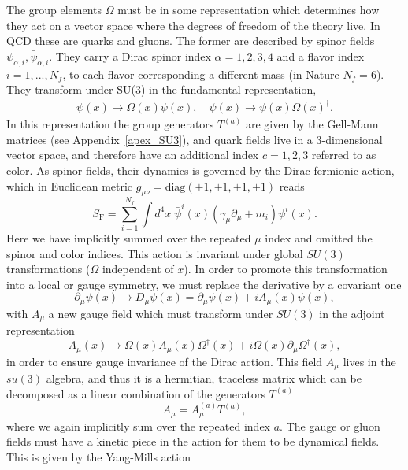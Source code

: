 The group elements $\Omega$ must be in some representation which determines how they act on a vector space where the degrees of freedom of the theory live. In QCD these are quarks and gluons. The former are described by spinor fields $\psi_{\alpha,i},\bar{\psi}_{\alpha,i}$. They carry a Dirac spinor index $\alpha=1,2,3,4$ and a flavor index $i=1,...,N_f$, to each flavor corresponding a different mass (in Nature $N_f=6$). They transform under SU(3) in the fundamental representation,
\begin{gather}
\psi(x)\to\Omega(x)\psi(x), \quad \bar{\psi}(x)\to\bar{\psi}(x)\Omega(x)^{\dagger}.
\end{gather}
In this representation the group generators $T^{(a)}$ are given by the Gell-Mann matrices (see Appendix~\ref{apex_SU3}), and quark fields live in a 3-dimensional vector space, and therefore have an additional index $c=1,2,3$ referred to as color. As spinor fields, their dynamics is governed by the Dirac fermionic action, which in Euclidean metric $g_{\mu\nu}=\textrm{diag}(+1,+1,+1,+1)$ reads
\begin{equation}
S_{\textrm{F}}=\sum_{i=1}^{N_f}\int d^4x\;\bar{\psi}^{i}(x)\left(\gamma_{\mu}\partial_{\mu}+m_i\right)\psi^i(x).
\end{equation} 
Here we have implicitly summed over the repeated $\mu$ index and omitted the spinor and color indices. This action is invariant under global $SU(3)$ transformations ($\Omega$ independent of $x$). In order to promote this transformation into a local or gauge symmetry, we must replace the derivative by a covariant one
\begin{equation}
\partial_{\mu}\psi(x)\to D_{\mu}\psi(x)=\partial_{\mu}\psi(x)+iA_{\mu}(x)\psi(x),
\end{equation}
with $A_{\mu}$ a new gauge field which must transform under $SU(3)$ in the adjoint representation
\begin{equation}
\label{ch_foundation:eq:Agauge}
A_{\mu}(x)\to\Omega(x)A_{\mu}(x)\Omega^{\dagger}(x)+i\Omega(x)\partial_{\mu}\Omega^{\dagger}(x),
\end{equation}
in order to ensure gauge invariance of the Dirac action. This field $A_{\mu}$ lives in the $su(3)$ algebra, and thus it is a hermitian, traceless matrix which can be decomposed as a linear combination of the generators $T^{(a)}$
\begin{equation}
A_{\mu}=A_{\mu}^{(a)}T^{(a)},
\end{equation}
where we again implicitly sum over the repeated index $a$. The gauge or gluon fields must have a kinetic piece in the action for them to be dynamical fields. This is given by the Yang-Mills action
